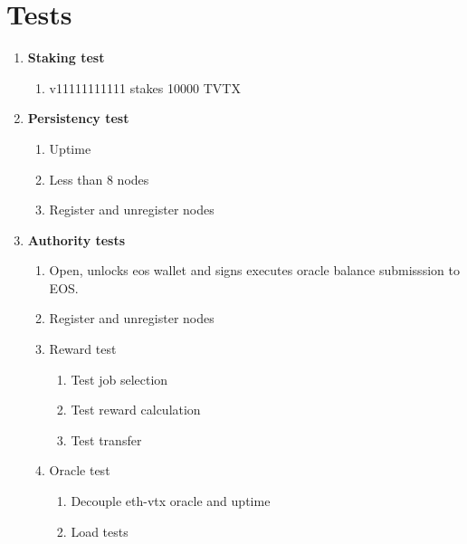 \documentclass[]{article}
\begin{document}
\section{Tests}
					\begin{enumerate}
						\item \textbf{Staking test}
						\begin{enumerate}
							\item v11111111111 stakes 10000 TVTX  
						\end{enumerate}
						\item \textbf{Persistency test}  
							\begin{enumerate}
								\item Uptime\textit{} 
								\item Less than 8 nodes 
								\item Register and unregister nodes  
							\end{enumerate}
						\item \textbf{Authority tests}
							\begin{enumerate}
							\item Open, unlocks eos wallet and signs executes oracle balance submisssion to EOS. 
							\item Register and unregister nodes  
							\item Reward test	
								\begin{enumerate}
										\item Test job selection 	
										\item Test reward calculation 	
										\item Test transfer 

								\end{enumerate}
								\item Oracle test	
							\begin{enumerate}
								\item Decouple eth-vtx oracle and uptime 
								\item Load tests 
							\end{enumerate}
						\end{enumerate}
				\end{enumerate}
\end{document}
